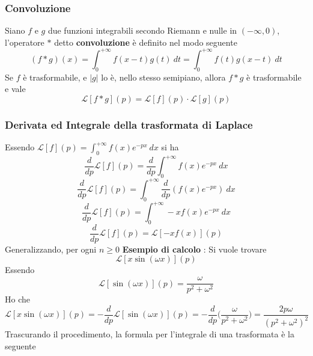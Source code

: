 \documentclass[10pt, letterpaper]{report}
\begin{document}
\subsubsection{Convoluzione}
Siano $f$ e $g$ due funzioni integrabili secondo Riemann e nulle in $(-\infty,0)$, l'operatore $*$ detto \textbf{convoluzione} è 
definito nel modo seguente 
$$ (f*g)(x)=\int_0^{+\infty}f(x-t)g(t)\ dt=\int_0^{+\infty}f(t)g(x-t)\ dt$$
Se $f$ è trasformabile, e $|g|$ lo è, nello stesso semipiano, allora $f*g$ è trasformabile e vale 
$$ \mathcal{L}[f*g](p)=\mathcal{L}[f](p)\cdot\mathcal{L}[g](p)$$
\subsubsection{Derivata ed Integrale della trasformata di Laplace}
Essendo $\mathcal{L}[f](p)=\int_0^{+\infty}f(x)e^{-px}\ dx$
si ha 
 $$\frac{d}{dp}\mathcal{L}[f](p)=\frac{d}{dp}\int_0^{+\infty}f(x)e^{-px}\ dx$$
  $$\frac{d}{dp}\mathcal{L}[f](p)=\int_0^{+\infty}\frac{d}{dp}(f(x)e^{-px})\ dx$$
   $$\frac{d}{dp}\mathcal{L}[f](p)=\int_0^{+\infty}-xf(x)e^{-px}\ dx$$
    $$\frac{d}{dp}\mathcal{L}[f](p)=\mathcal{L}[-xf(x)](p)$$
    Generalizzando, per ogni $n\ge 0$ 
\textbf{Esempio di calcolo} : Si vuole trovare  
$$ \mathcal{L}[x\sin(\omega x)](p)$$
Essendo 
$$  \mathcal{L}[\sin(\omega x)](p) = \frac{\omega}{p^2+\omega^2}$$
Ho che 
$$\mathcal{L}[x\sin(\omega x)](p) = - \frac{d}{dp}\mathcal{L}[\sin(\omega x)](p) = 
- \frac{d}{dp}\Big(\frac{\omega}{p^2+\omega^2}\Big)=\frac{2p\omega}{(p^2+\omega^2)^2}$$
Trascurando il procedimento, la formula per l'integrale di una trasformata è la seguente 
\end{document}
